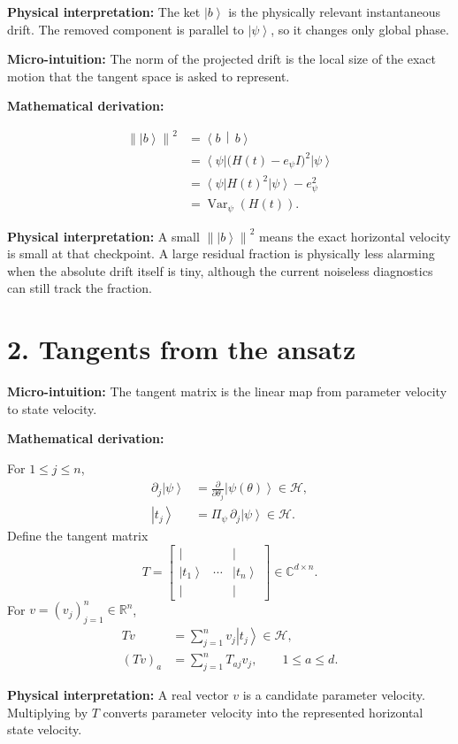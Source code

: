 \documentclass[10pt,twocolumn]{article}
\newcommand{\ket}[1]{\left|#1\right\rangle}
\newcommand{\bra}[1]{\left\langle#1\right|}
\newcommand{\braket}[2]{\left\langle #1\,\middle|\,#2\right\rangle}
\newcommand{\norm}[1]{\left\lVert #1\right\rVert}
\newcommand{\R}{\mathbb R}
\newcommand{\C}{\mathbb C}
\newcommand{\Hh}{\mathcal H}
\newcommand{\Id}{I}
\newcommand{\micro}[1]{%
  \par\smallskip
  \noindent\textcolor{deepblue}{\textbf{Micro-intuition:}} #1
  \par\smallskip}
\newcommand{\deriv}{%
  \par\noindent\textcolor{deepviolet}{\textbf{Mathematical derivation:}}\par\vspace{-1mm}}
\newcommand{\phys}[1]{%
  \par\smallskip
  \noindent\textcolor{deepgreen}{\textbf{Physical interpretation:}} #1
  \par\smallskip}
\begin{document}
\phys{The ket \(\ket b\) is the physically relevant instantaneous drift. The
removed component is parallel to \(\ket\psi\), so it changes only global phase.}

\micro{The norm of the projected drift is the local size of the exact motion
that the tangent space is asked to represent.}

\deriv
\[
\begin{aligned}
\norm{\ket b}^2
&=\braket{b}{b}\\
&=\bra{\psi}\bigl(H(t)-e_\psi\Id\bigr)^2\ket{\psi}\\
&=\bra{\psi}H(t)^2\ket{\psi}-e_\psi^2\\
&=\operatorname{Var}_{\psi}(H(t)).
\end{aligned}
\]

\phys{A small \(\norm{\ket b}^2\) means the exact horizontal velocity is small at that
checkpoint. A large residual fraction is physically less alarming when the
absolute drift itself is tiny, although the current noiseless diagnostics can
still track the fraction.}

\section*{2. Tangents from the ansatz}

\micro{The tangent matrix is the linear map from parameter velocity to state
velocity.}

\deriv
For \(1\le j\le n\),
\[
\begin{aligned}
\partial_j\ket{\psi}
&=\frac{\partial}{\partial\theta_j}\ket{\psi(\theta)}\in\Hh,\\
\ket{t_j}&=\Pi_\psi\,\partial_j\ket{\psi}\in\Hh.
\end{aligned}
\]
Define the tangent matrix
\[
T=
\begin{bmatrix}
| & & |\\
\ket{t_1}&\cdots&\ket{t_n}\\
| & & |
\end{bmatrix}
\in\C^{d\times n}.
\]
For \(v=(v_j)_{j=1}^n\in\R^n\),
\[
\begin{aligned}
Tv
&=\sum_{j=1}^n v_j\ket{t_j}\in\Hh,\\
(Tv)_a
&=\sum_{j=1}^n T_{aj}v_j,\qquad 1\le a\le d.
\end{aligned}
\]

\phys{A real vector \(v\) is a candidate parameter velocity. Multiplying by
\(T\) converts parameter velocity into the represented horizontal state
velocity.}
\end{document}
